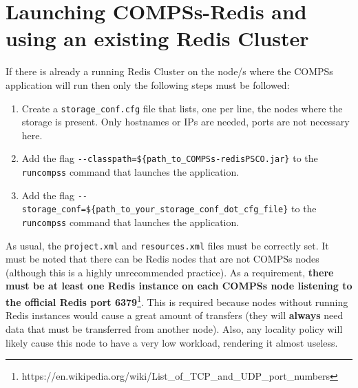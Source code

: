 \documentclass{article}
\begin{document}
  \section{Launching COMPSs-Redis and using an existing Redis Cluster}
  If there is already a running Redis Cluster on the node/s where the COMPSs application will run then only the following steps must be followed:
  \begin{enumerate}
  \item Create a \verb|storage_conf.cfg| file that lists, one per line, the nodes where the storage is present. Only hostnames or IPs are needed, ports are not necessary here.
  \item Add the flag \verb|--classpath=${path_to_COMPSs-redisPSCO.jar}| to the \verb|runcompss| command that launches the application.
  \item Add the flag \verb|--storage_conf=${path_to_your_storage_conf_dot_cfg_file}| to the \verb|runcompss| command that launches the application.
  \end{enumerate}
  As usual, the \verb|project.xml| and \verb|resources.xml| files must be correctly set. It must be noted that there can be Redis nodes that are not COMPSs nodes (although this is a highly unrecommended practice).
  As a requirement, \textbf{there must be at least one Redis instance on each COMPSs node listening to the official Redis port 6379}\footnote{https://en.wikipedia.org/wiki/List\_of\_TCP\_and\_UDP\_port\_numbers}. This is required because nodes without running Redis instances would cause a great amount of transfers (they will \textbf{always} need data that must be transferred from another node). Also, any locality policy will likely cause this node to have a very low workload, rendering it almost useless.
\end{document}
